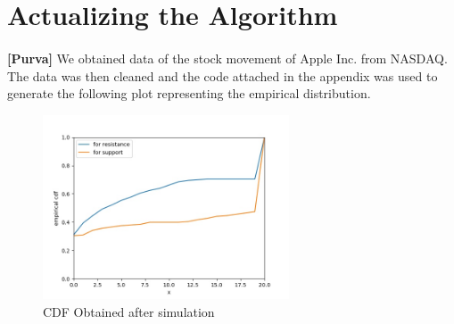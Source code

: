 \documentclass[letterpaper, 12pt] {article}
\begin{document}
	\section{Actualizing the Algorithm}
	
	\paragraph{}
	\textbf{[Purva]} We obtained data of the stock movement of Apple Inc. from NASDAQ. The data was then cleaned and the code attached in the appendix was used to generate the following plot representing the empirical distribution.
	
	\begin{figure}[h!]
		\centering
		\includegraphics[width=0.65\textwidth]{emp_cdf_apple_c}
		\caption{CDF Obtained after simulation}
		\label{Figure 5}
	\end{figure}
	
	\pagebreak
\end{document}
